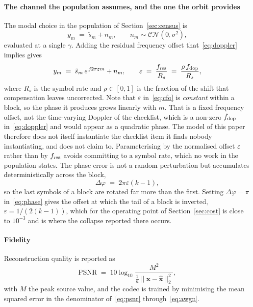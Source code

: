 \documentclass[preprint,11pt,3p]{elsarticle}
\begin{document}
\paragraph{The channel the population assumes, and the one the orbit provides}
The modal choice in the population of Section~\ref{sec:census} is
\begin{equation}
  y_m \;=\; \tilde s_m + n_m , \qquad n_m \sim \mathcal{CN}(0, \sigma^{2}) ,
  \label{eq:awgn}
\end{equation}
evaluated at a single $\gamma$. Adding the residual frequency offset that~\eqref{eq:doppler}
implies gives
\begin{equation}
  y_m \;=\; \tilde s_m \, e^{\,j 2\pi \varepsilon m} + n_m ,
  \qquad
  \varepsilon \;=\; \frac{f_{\rm res}}{R_s} \;=\; \frac{\rho\, f_{\rm dop}}{R_s} ,
  \label{eq:cfo}
\end{equation}
where $R_s$ is the symbol rate and $\rho \in [0,1]$ is the fraction of the shift that
compensation leaves uncorrected. Note that $\varepsilon$ in~\eqref{eq:cfo} is
\emph{constant} within a block, so the phase it produces grows linearly with $m$. That is a
fixed frequency offset, not the time-varying Doppler of the checklist, which is a non-zero
$\dot f_{\rm dop}$ in~\eqref{eq:doppler} and would appear as a quadratic phase. The model of
this paper therefore does not itself instantiate the checklist item it finds nobody instantiating,
and does not claim to. Parameterising by the normalised offset $\varepsilon$ rather
than by $f_{\rm res}$ avoids committing to a symbol rate, which no work in the population states.
The phase error is not a random perturbation but accumulates deterministically across the block,
\begin{equation}
  \Delta \varphi \;=\; 2\pi \varepsilon (k-1) ,
  \label{eq:phase}
\end{equation}
so the last symbols of a block are rotated far more than the first. Setting $\Delta\varphi = \pi$
in~\eqref{eq:phase} gives the offset at which the tail of a block is inverted,
$\varepsilon = 1/(2(k-1))$, which for the operating point of Section~\ref{sec:cost} is close to
$10^{-3}$ and is where the collapse reported there occurs.

\paragraph{Fidelity}
Reconstruction quality is reported as
\begin{equation}
  \mathrm{PSNR} \;=\; 10 \log_{10} \frac{M^{2}}
  {\tfrac{1}{n} \lVert \mathbf{x} - \hat{\mathbf{x}} \rVert_2^{2}} ,
  \label{eq:psnr}
\end{equation}
with $M$ the peak source value, and the codec is trained by minimising the mean squared error
in the denominator of~\eqref{eq:psnr} through~\eqref{eq:awgn}.
\end{document}
